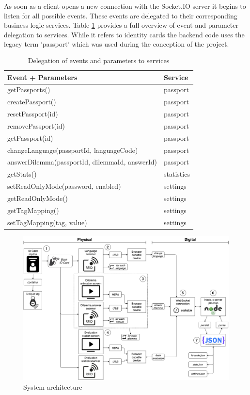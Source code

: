 As soon as a client opens a new connection with the Socket.IO server it begins to listen for all possible events.
These events are delegated to their corresponding business logic services.
Table \ref{tbl:eventservices} provides a full overview of event and parameter delegation to services.
While it refers to identity cards the backend code uses the legacy term 'passport' which was used during the conception of the project.

\begin{table}
  \centering
  \begin{tabular}{ |l|l| }
    \hline
    \textbf{Event + Parameters} & \textbf{Service} \\
    \hline
    getPassports() & passport \\
    createPassport() & passport \\
    resetPassport(id) & passport \\
    removePassport(id) & passport \\
    getPassport(id) & passport \\
    changeLanguage(passportId, languageCode) & passport \\
    answerDilemma(passportId, dilemmaId, answerId) & passport \\
    getStats() & statistics \\
    setReadOnlyMode(password, enabled) & settings \\
    getReadOnlyMode() & settings \\
    getTagMapping() & settings \\
    setTagMapping(tag, value) & settings \\
    \hline
  \end{tabular}
  \caption{Delegation of events and parameters to services} \label{tbl:eventservices}
\end{table}


\begin{figure}
  \includegraphics[width=15cm,keepaspectratio]{assets/system-architecture.png}
  \caption{System architecture}
  \label{fig:architecture}
\end{figure}


